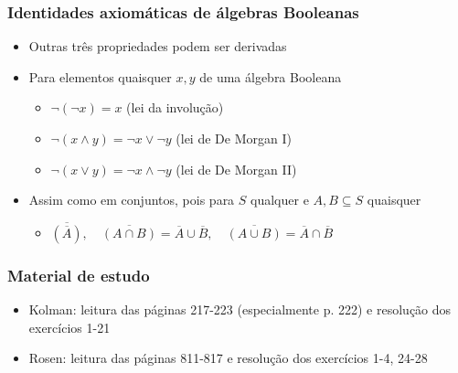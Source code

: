 \documentclass[12pt]{beamer}
\begin{document}
\begin{frame}
  \frametitle{Identidades axiomáticas de álgebras Booleanas}
  \begin{itemize}
    \item<1-> Outras três propriedades podem ser derivadas
    \item<1-> Para elementos quaisquer $x, y$ de uma álgebra Booleana
    \begin{itemize}[itemsep=0pt]
      \item<2-> $\neg (\neg x) = x$ (lei da involução)
      \item<3-> $\neg (x \wedge y) = \neg x \vee \neg y$ (lei de De Morgan I)
      \item<3-> $\neg (x \vee y) = \neg x \wedge \neg y$ (lei de De Morgan II)
    \end{itemize}
    \item<4-> Assim como em conjuntos, pois para $S$ qualquer e $A, B \subseteq
        S$ quaisquer
    \begin{itemize}
      \item $\overline{(\overline{A})}, \quad \overline{(A \cap B)} =
          \overline{A} \cup \overline{B}, \quad \overline{(A \cup B)} =
            \overline{A} \cap \overline{B}$
    \end{itemize}
  \end{itemize}
\end{frame}

\begin{frame}
  \frametitle{Material de estudo}
  
  
  \begin{itemize}[itemsep=0pt]
    \nocite{Kolman:book:1999}
    \item Kolman: leitura das páginas 217-223 (especialmente p. 222) e
        resolução dos exercícios 1-21
    \nocite{Rosen:book:2011}
    \item Rosen: leitura das páginas 811-817 e resolução dos
        exercícios 1-4, 24-28
  \end{itemize}
\end{frame}
\end{document}
